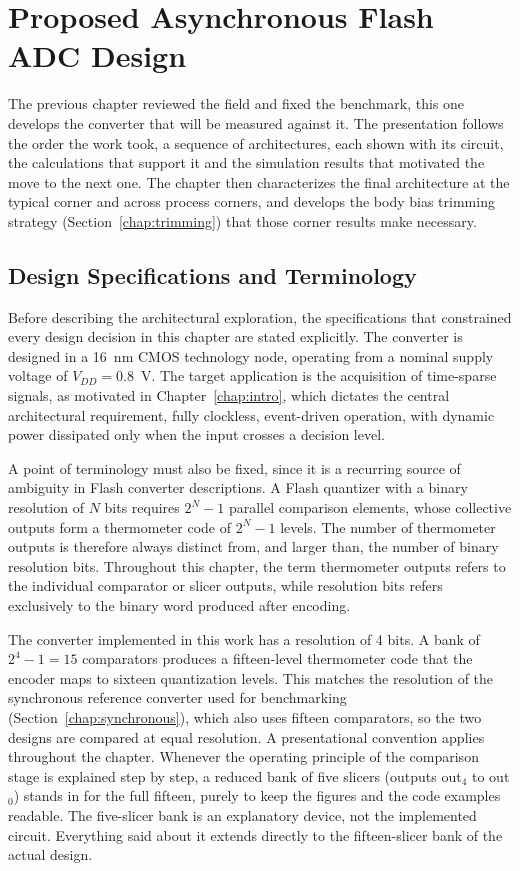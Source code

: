 
\chapter{Proposed Asynchronous Flash ADC Design}
\label{chap:async}

The previous chapter reviewed the field and fixed the benchmark, this one develops the converter that will be measured against it. The presentation follows the order the work took, a sequence of architectures, each shown with its circuit, the calculations that support it and the simulation results that motivated the move to the next one. The chapter then characterizes the final architecture at the typical corner and across process corners, and develops the body bias trimming strategy (Section~\ref{chap:trimming}) that those corner results make necessary.

\section{Design Specifications and Terminology}
\label{sec:design_specs}

Before describing the architectural exploration, the specifications that constrained every design decision in this chapter are stated explicitly. The converter is designed in a 16~nm CMOS technology node, operating from a nominal supply voltage of $V_{DD} = 0.8$~V. The target application is the acquisition of time-sparse signals, as motivated in Chapter~\ref{chap:intro}, which dictates the central architectural requirement, fully clockless, event-driven operation, with dynamic power dissipated only when the input crosses a decision level.

A point of terminology must also be fixed, since it is a recurring source of ambiguity in Flash converter descriptions. A Flash quantizer with a binary resolution of $ N $ bits requires $2^N - 1$ parallel comparison elements, whose collective outputs form a thermometer code of $2^N - 1$ levels. The number of thermometer outputs is therefore always distinct from, and larger than, the number of binary resolution bits. Throughout this chapter, the term thermometer outputs refers to the individual comparator or slicer outputs, while resolution bits refers exclusively to the binary word produced after encoding.

The converter implemented in this work has a resolution of 4 bits. A bank of $2^4 - 1 = 15$ comparators produces a fifteen-level thermometer code that the encoder maps to sixteen quantization levels. This matches the resolution of the synchronous reference converter used for benchmarking (Section~\ref{chap:synchronous}), which also uses fifteen comparators, so the two designs are compared at equal resolution. A presentational convention applies throughout the chapter. Whenever the operating principle of the comparison stage is explained step by step, a reduced bank of five slicers (outputs out$_4$ to out$_0$) stands in for the full fifteen, purely to keep the figures and the code examples readable. The five-slicer bank is an explanatory device, not the implemented circuit. Everything said about it extends directly to the fifteen-slicer bank of the actual design.

